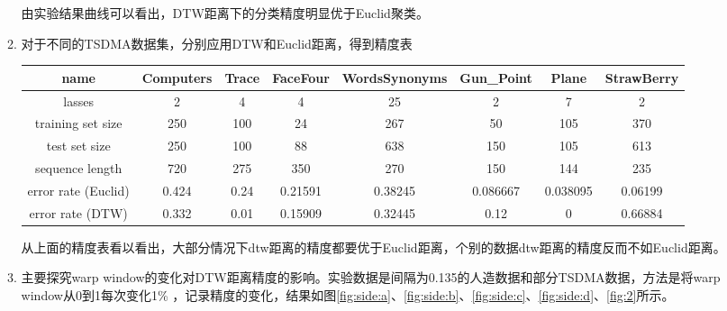 \documentclass{ctexart}
\begin{document}
\begin{itemize}
\begin{enumerate}
            由实验结果曲线可以看出，DTW距离下的分类精度明显优于Euclid聚类。

        \item 对于不同的TSDMA数据集，分别应用DTW和Euclid距离，得到精度表

            \begin{flushleft}
              \begin{tabular}{|c|c|c|c|c|c|c|c|}
              \hline
              name & Computers & Trace & FaceFour & WordsSynonyms & Gun\_Point & Plane & StrawBerry \\
              \hline
              lasses & 2 & 4 & 4 & 25 & 2 & 7 & 2 \\
              \hline
              training set size & 250 & 100 & 24 & 267 & 50 & 105 & 370 \\
              \hline
              test set size & 250 & 100 & 88 & 638 & 150 & 105 & 613 \\
              \hline
              sequence length & 720 & 275 & 350 & 270 & 150 & 144 & 235 \\
              \hline
              error rate (Euclid) & 0.424 & 0.24 & 0.21591 & 0.38245 & 0.086667 & 0.038095 & 0.06199 \\
              \hline
              error rate (DTW) & 0.332 & 0.01 & 0.15909 & 0.32445 & 0.12 & 0 & 0.66884 \\
              \hline
            \end{tabular}
            \end{flushleft}

            从上面的精度表看以看出，大部分情况下dtw距离的精度都要优于Euclid距离，个别的数据dtw距离的精度反而不如Euclid距离。
        \item 主要探究warp window的变化对DTW距离精度的影响。实验数据是间隔为0.135的人造数据和部分TSDMA数据，方法是将warp window从0到1每次变化1\% ，记录精度的变化，结果如图\ref{fig:side:a}、\ref{fig:side:b}、\ref{fig:side:c}、\ref{fig:side:d}、\ref{fig:2}所示。


\end{enumerate}
\end{itemize}
\end{document}

